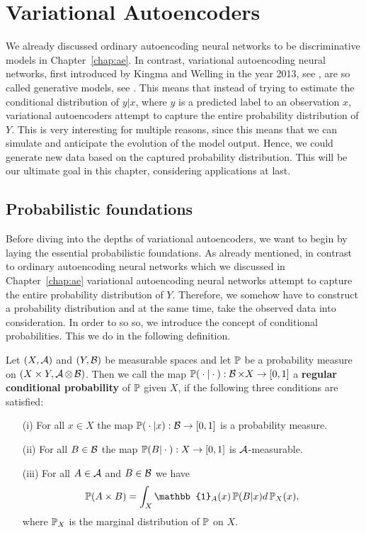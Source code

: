 \chapter{Variational Autoencoders}\label{chap:vae}
We already discussed ordinary autoencoding neural networks to be discriminative models in Chapter~\ref{chap:ae}. In contrast, variational autoencoding neural networks, first introduced by Kingma and Welling in the year 2013, see \cite{kingma2013auto}, are so called generative models, see \cite[Chapter~5]{cinelli2021variational}. This means that instead of trying to estimate the conditional distribution of $y|x$, where $y$ is a predicted label to an observation $x$, variational autoencoders attempt to capture the entire probability distribution of $Y$. This is very interesting for multiple reasons, since this means that we can simulate and anticipate the evolution of the model output. Hence, we could generate new data based on the captured probability distribution. This will be our ultimate goal in this chapter, considering applications at last.

\section{Probabilistic foundations}\label{sec:prob_foundations}

Before diving into the depths of variational autoencoders, we want to begin by laying the essential probabilistic foundations. As already mentioned, in contrast to ordinary autoencoding neural networks which we discussed in Chapter~\ref{chap:ae} variational autoencoding neural networks attempt to capture the entire probability distribution of $Y$. Therefore, we somehow have to construct a probability distribution and at the same time, take the observed data into consideration. In order to so so, we introduce the concept of conditional probabilities. This we do in the following definition.

\begin{definition}\label{def:cond_prob}
Let $(X,\operatorname{\mathcal{A}})$ and $(Y,\operatorname{\mathcal{B}})$ be measurable spaces and let $\operatorname{\mathbb{P}}$ be a probability measure on $(X\times Y, \operatorname{\mathcal{A}}\otimes \operatorname{\mathcal{B}})$. Then we call the map $\operatorname{\mathbb{P}}({}\cdot{}|{}\cdot{}):\operatorname{\mathcal{B}}\times X \to [0, 1]$ a \textbf{regular conditional probability} of $\operatorname{\mathbb{P}}$ given $X$, if the following three conditions are satisfied:
\begin{itemize}
\item[(i)]   For all $x\in X$ the map $\operatorname{\mathbb{P}}({}\cdot{}|x): \operatorname{\mathcal{B}} \to [0,1]$ is a probability measure.
\item[(ii)]  For all $B\in\operatorname{\mathcal{B}}$ the map $\operatorname{\mathbb{P}}(B|{}\cdot{}): X \to [0,1]$ is $\operatorname{\mathcal{A}}$-measurable.
\item[(iii)] For all $A\in\operatorname{\mathcal{A}}$ and $B\in\operatorname{\mathcal{B}}$ we have \begin{align*}
\prob(A\times B) = \int_{X} \mathbb{1}_{A}(x) \prob(B|x)d\prob_X(x),
\end{align*}
where $\operatorname{\mathbb{P}}_X$ is the marginal distribution of $\operatorname{\mathbb{P}}$ on $X$.
\end{itemize}
\end{definition}

